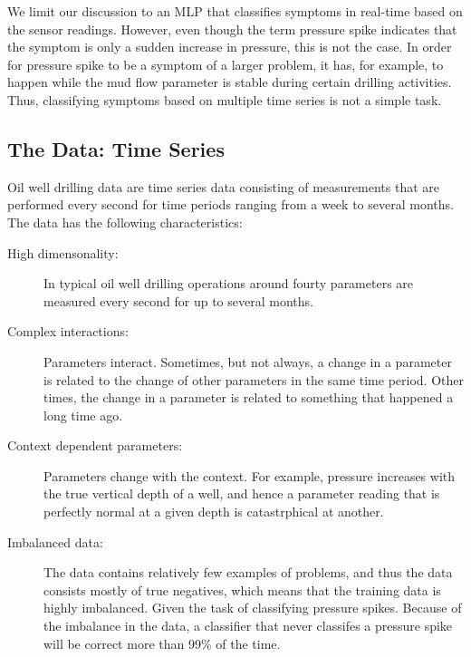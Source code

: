 \documentclass{article}
\begin{document}
We limit our discussion to an MLP that classifies symptoms in real-time based on the sensor readings.
However, even though the term pressure spike indicates that the symptom is only a sudden increase in pressure, this is not the case.
In order for pressure spike to be a symptom of a larger problem, it has, for example, to happen while the mud flow parameter is stable during certain drilling activities.
Thus, classifying symptoms based on multiple time series is not a simple task.



\subsection{The Data: Time Series}
Oil well drilling data are time series data consisting of measurements that are performed  every second for time periods ranging from a week to several months.
The data has the following characteristics:

\begin{description}

\item [High dimensonality:] 
In typical oil well drilling operations around fourty parameters are measured every second for up to several months.

\item [Complex interactions:] 
Parameters interact. 
Sometimes, but not always, a change in a parameter is related to the change of other parameters in the same time period.
Other times, the change in a parameter is related to something that happened a long time ago.

\item [Context dependent parameters:]
Parameters change with the context.
For example, pressure increases with the true vertical depth of a well, and hence a parameter reading that is perfectly normal at a given depth is catastrphical at another.

\item [Imbalanced data:] 
The data contains relatively few examples of problems, and thus the data consists mostly of true negatives, which means that the training data is highly imbalanced. 
Given the task of classifying pressure spikes.
Because of the imbalance in the data, a classifier that never classifes a pressure spike will be correct more than 99\% of the time.
\end{description}
\end{document}
